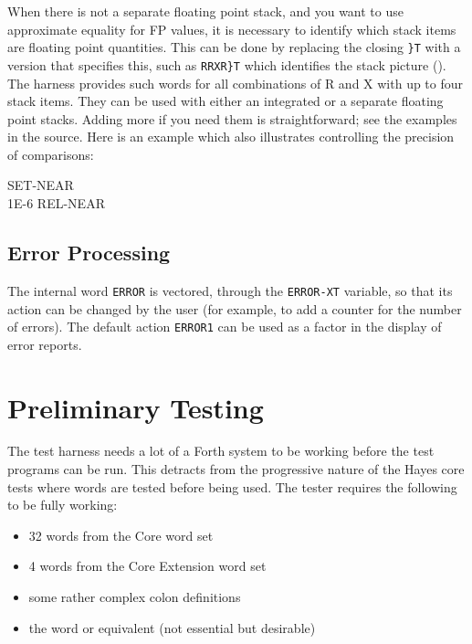 When there is not a separate floating point stack, and you want to use
approximate equality for FP values, it is necessary to identify which
stack items are floating point quantities.  This can be done by
replacing the closing \texttt{\}T} with a version that specifies
this, such as \texttt{RRXR\}T} which identifies the stack picture
\linebreak ().  The harness provides such words for all
combinations of R and X with up to four stack items.  They can be
used with either an integrated or a separate floating point stacks.
Adding more if you need them is straightforward; see the examples in
the source.  Here is an example which also illustrates controlling
the precision of comparisons:

\begin{tt}
SET-NEAR \\
1E-6 REL-NEAR  \\
\end{tt}

\subsection{Error Processing}

The internal word \texttt{ERROR} is vectored, through the
\texttt{ERROR-XT} variable, so that its action can be changed by
the user (for example, to add a counter for the number of errors).
The default action \texttt{ERROR1} can be used as a factor in the
display of error reports.

\section{Preliminary Testing}

The test harness needs a lot of a Forth system to be working before
the test programs can be run. This detracts from the progressive
nature of the Hayes core tests where words are tested before being
used. The tester requires the following to be fully working:

\begin{itemize}
\item 32 words from the Core word set
\item 4 words from the Core Extension word set
\item some rather complex colon definitions
\item the word  or equivalent (not essential but desirable)
\end{itemize}

